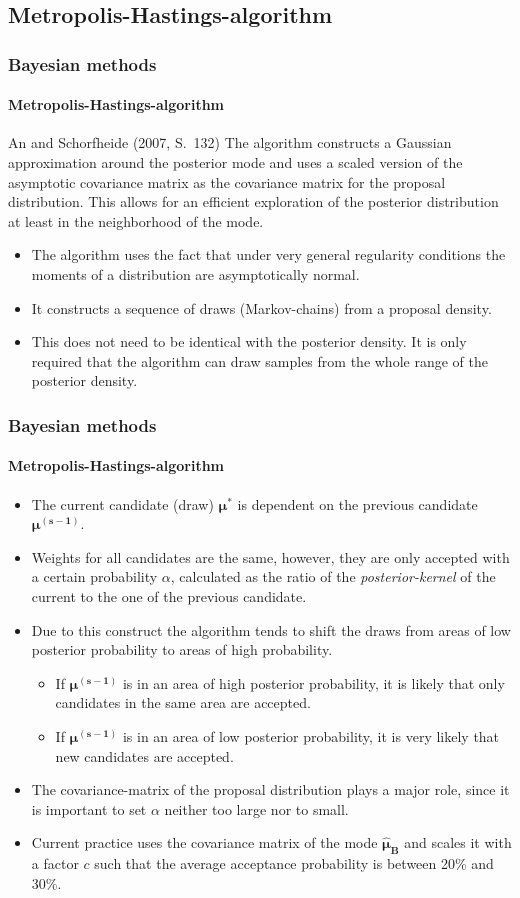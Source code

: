 \documentclass{beamer} %
\begin{document}
\subsection{Metropolis-Hastings-algorithm}
\begin{frame}\frametitle{Bayesian methods}\framesubtitle{Metropolis-Hastings-algorithm}
\begin{block}{An and Schorfheide (2007, S.~132)}
  The algorithm constructs a Gaussian approximation around the posterior mode and
  uses a scaled version of the asymptotic covariance matrix as the covariance
  matrix for the proposal distribution. This allows for an efficient
  exploration of the posterior distribution at least in the neighborhood of
  the mode.
\end{block}
\begin{itemize}
  \item The algorithm uses the fact that under very general regularity conditions the moments of a distribution are asymptotically normal.
\item It constructs a sequence of draws (Markov-chains) from a proposal density.
\item This does not need to be identical with the posterior density. It is only required that the algorithm can draw samples from the whole range of the posterior density.
\end{itemize}
\end{frame}


\begin{frame}\frametitle{Bayesian methods}\framesubtitle{Metropolis-Hastings-algorithm}
\begin{itemize}
  \item The current candidate (draw) $\boldsymbol{\mu^*}$ is dependent on the previous candidate $\boldsymbol{\mu^{(s-1)}}$.
  \item Weights for all candidates are the same, however, they are only accepted with a certain probability $\alpha$, calculated as the ratio of the \emph{posterior-kernel} of the current to the one of the previous candidate.
  \item Due to this construct the algorithm tends to shift the draws from areas of low posterior probability to areas of high probability.
  \begin{itemize}
    \item If $\boldsymbol{\mu^{(s-1)}}$ is in an area of high posterior probability, it is likely that only candidates in the same area are accepted.
    \item If $\boldsymbol{\mu^{(s-1)}}$ is in an area of low posterior probability, it is very likely that new candidates are accepted.
  \end{itemize}
\item The covariance-matrix of the proposal distribution plays a major role, since it is important to set $\alpha$ neither too large nor to small.
\item Current practice uses the covariance matrix of the mode $\boldsymbol{\widehat{\mu}_B}$ and scales it with a factor $c$ such that the average acceptance probability is between 20\% and 30\%.
\end{itemize}

\end{frame}
\end{document}
